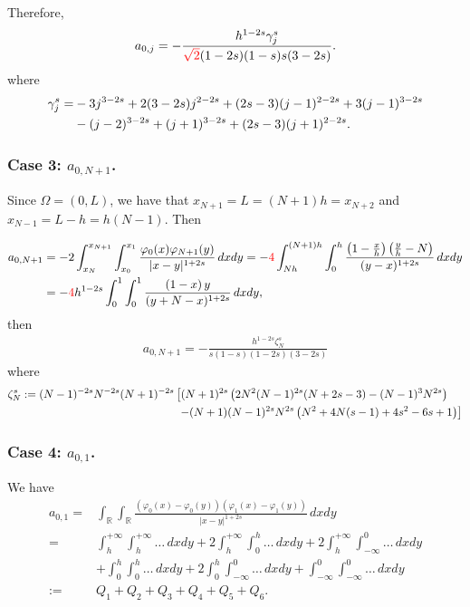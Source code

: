 \documentclass[10 pt]{article}
\numberwithin{equation}{section}
\newcommand{\RR}{\mathbb{R}}
\newcommand{\B}[1]{{\color{red} #1}}  %
\begin{document}
Therefore,
\begin{align*}
	a_{0,j} =-\frac{h^{1-2 s} \gamma_j^s }{\B{\sqrt{2}}(1-2 s) (1-s) s (3- 2s )}.
\end{align*} 
where
%
\begin{align}\notag
\gamma_j^s= &-3 j^{3-2 s}+2 (3-2 s) j^{2-2 s}+(2 s-3)
   (j-1)^{2-2 s}+3 (j-1)^{3-2 s} \\ \label{eq:def_gamma_j}
   &-(j-2)^{3-2 s}+(j+1)^{3-2 s}+(2
   s-3) (j+1)^{2-2 s}.
\end{align}
%

\subsubsection{Case 3: $a_{0,N+1}$.} Since $\Omega=(0,L)$, we have that $x_{N+1}=L=(N+1)h=x_{N+2}$ and $x_{N-1}=L-h=h(N-1)$. Then

\begin{align*}
a_{0,N+1}&=-2 \int_{x_{N}}^{x_{N+1}}\int_{x_0}^{x_1}\frac{\varphi_0(x)\varphi_{N+1}(y)}{|x-y|^{1+2s}}\,dxdy
=-\B{4}\int_{Nh}^{(N+1)h}\int_0^{h}\frac{\left(1-\frac{x}{h}\right)\left(\frac{y}{h}-N\right)}{(y-x)^{1+2s}}\,dxdy\\
&=-\B{4}h^{1-2s}\int_{0}^{1}\int_0^{1}\frac{\left(1-x\right)y}{(y+N-x)^{1+2s}}\,dxdy,
\end{align*}
then
%
\begin{align*}
a_{0,N+1} = -\frac{h^{1-2 s} \zeta_N^s }{s(1-s)(1-2s )(3-2 s)}
\end{align*}
%
where 
%
\begin{align}\notag 
\zeta_N^s:= (N-1)^{-2 s} N^{-2 s} (N+1)^{-2 s}
   &\left[(N+1)^{2 s} \left(2 N^2 (N-1)^{2 s} (N+2 s-3)-(N-1)^3
   N^{2 s}\right) \right. \\  & \label{eq:def_zeta_N} \;
   \left. -(N+1) (N-1)^{2 s} N^{2 s} \left(N^2+4 N (s-1)+4
   s^2-6 s+1\right)\right]
\end{align}
%


\subsubsection{Case 4: $a_{0,1}$.}

We have 
	\begin{align*}
	a_{0,1}= & \int_{\RR}\int_{\RR}\frac{(\varphi_0(x)-\varphi_0(y))(\varphi_{1}(x)-\varphi_{1}(y))}{|x-y|^{1+2s}}\,dxdy
	\\
	= & \int_{h}^{+\infty}\int_{h}^{+\infty} \ldots\,dxdy + 2\int_{h}^{+\infty}\int_{0}^{h} \ldots\,dxdy + 2\int_{h}^{+\infty}\int_{-\infty}^{0} \ldots\,dxdy 
	\\
	& + \int_{0}^{h}\int_{0}^{h} \ldots\,dxdy + 2\int_{0}^{h}\int_{-\infty}^{0} \ldots\,dxdy + \int_{-\infty}^{0}\int_{-\infty}^{0} \ldots\,dxdy 
	\\
	:= & Q_1 + Q_2 + Q_3 + Q_4 + Q_5 + Q_6.
\end{align*}
\end{document}
